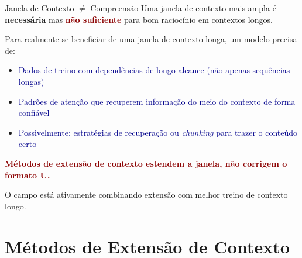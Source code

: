 \documentclass[aspectratio=169, xcolor=dvipsnames]{beamer}
\begin{document}
  \begin{frame}{Janela de Contexto $\neq$ Compreensão}
    Uma janela de contexto mais ampla é \textbf{necessária} mas \textcolor{DarkRed}{\textbf{não suficiente}} para bom raciocínio em contextos longos.

    \vspace{0.5em}
    Para realmente se beneficiar de uma janela de contexto longa, um modelo precisa de:
    \begin{itemize}
      \item \textcolor{DarkBlue}{Dados de treino com dependências de longo alcance (não apenas sequências longas)}
      \item \textcolor{DarkBlue}{Padrões de atenção que recuperem informação do meio do contexto de forma confiável}
      \item \textcolor{DarkBlue}{Possivelmente: estratégias de recuperação ou \textit{chunking} para trazer o conteúdo certo}
    \end{itemize}

    \vspace{0.3em}
    \textcolor{DarkRed}{\textbf{Métodos de extensão de contexto estendem a janela, não corrigem o formato U.}}

    O campo está ativamente combinando extensão com melhor treino de contexto longo.
  \end{frame}

  \section{Métodos de Extensão de Contexto}
\end{document}
